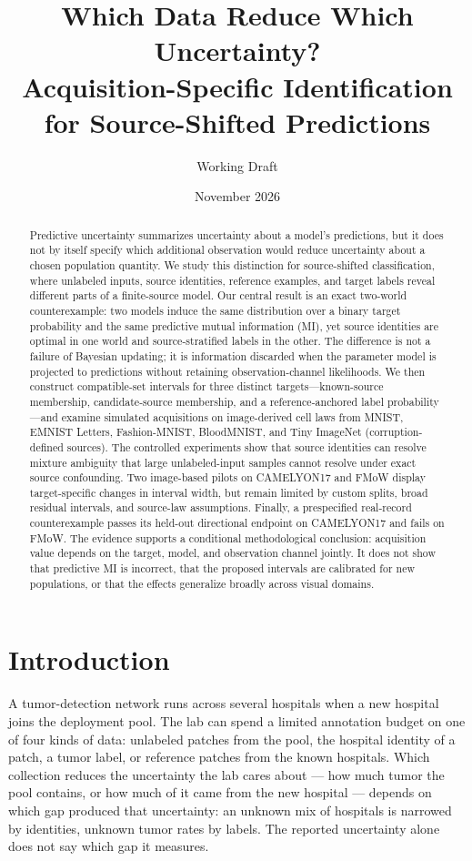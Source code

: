 \documentclass[11pt]{article}
\title{Which Data Reduce Which Uncertainty?\\[0.3em]
\large Acquisition-Specific Identification for Source-Shifted Predictions}
\author{Working Draft}
\date{November 2026}
\begin{document}
\maketitle

\begin{abstract}
Predictive uncertainty summarizes uncertainty about a model's predictions, but it does not by itself specify which additional observation would reduce uncertainty about a chosen population quantity. We study this distinction for source-shifted classification, where unlabeled inputs, source identities, reference examples, and target labels reveal different parts of a finite-source model. Our central result is an exact two-world counterexample: two models induce the same distribution over a binary target probability and the same predictive mutual information (MI), yet source identities are optimal in one world and source-stratified labels in the other. The difference is not a failure of Bayesian updating; it is information discarded when the parameter model is projected to predictions without retaining observation-channel likelihoods. We then construct compatible-set intervals for three distinct targets---known-source membership, candidate-source membership, and a reference-anchored label probability---and examine simulated acquisitions on image-derived cell laws from MNIST, EMNIST Letters, Fashion-MNIST, BloodMNIST, and Tiny ImageNet (corruption-defined sources). The controlled experiments show that source identities can resolve mixture ambiguity that large unlabeled-input samples cannot resolve under exact source confounding. Two image-based pilots on CAMELYON17 and FMoW display target-specific changes in interval width, but remain limited by custom splits, broad residual intervals, and source-law assumptions. Finally, a prespecified real-record counterexample passes its held-out directional endpoint on CAMELYON17 and fails on FMoW. The evidence supports a conditional methodological conclusion: acquisition value depends on the target, model, and observation channel jointly. It does not show that predictive MI is incorrect, that the proposed intervals are calibrated for new populations, or that the effects generalize broadly across visual domains.
\end{abstract}

\section{Introduction}

A tumor-detection network runs across several hospitals when a new hospital joins the deployment pool. The lab can spend a limited annotation budget on one of four kinds of data: unlabeled patches from the pool, the hospital identity of a patch, a tumor label, or reference patches from the known hospitals. Which collection reduces the uncertainty the lab cares about --- how much tumor the pool contains, or how much of it came from the new hospital --- depends on which gap produced that uncertainty: an unknown mix of hospitals is narrowed by identities, unknown tumor rates by labels. The reported uncertainty alone does not say which gap it measures.
\end{document}
